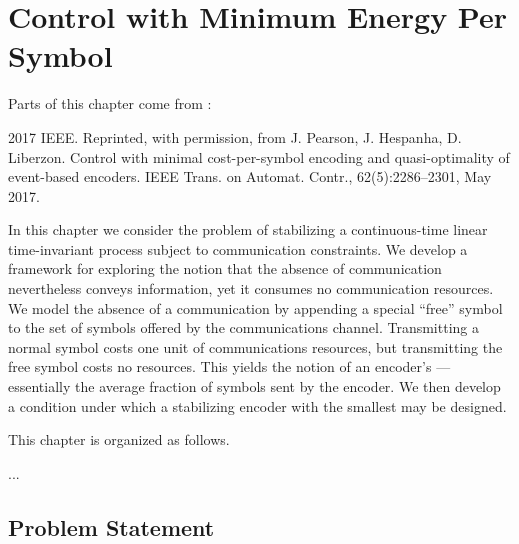 \newif\ifIEEE                          %
\IEEEfalse 

\newif\ifIEEEonecol
\IEEEonecolfalse  

\newif\iftechrep    %
\techreptrue





\chapter{Control with Minimum Energy Per Symbol}
\label{chap:mineng}

Parts of this chapter come from \cite{PearsonHespanhaLiberzonMay2017}:

2017 IEEE. Reprinted, with permission, from J. Pearson, J. Hespanha, D. Liberzon. Control with minimal cost-per-symbol encoding and quasi-optimality of event-based encoders. IEEE Trans. on Automat. Contr., 62(5):2286--2301, May 2017.


In this chapter we consider the problem of stabilizing a continuous-time linear
time-invariant process subject to communication constraints. We develop a framework for exploring the notion that the absence of communication nevertheless conveys information, yet it consumes no communication resources. We model the absence of a communication by appending a special ``free'' symbol to the set of symbols offered by the communications channel. Transmitting a normal symbol costs one unit of communications resources, but transmitting the free symbol costs no resources. This yields the notion of an encoder's \emph{\avecost{}} --- essentially the average fraction of \nonfree{} symbols sent by the encoder. We then develop a condition under which a stabilizing encoder with the smallest \avecost{} may be designed.


This chapter is organized as follows. 

...

\section{Problem Statement}
\label{sxn:min-bit-rate}


